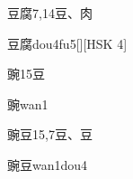 \begin{Entry}{豆腐}{7,14}{⾖、⾁}
  \begin{Phonetics}{豆腐}{dou4fu5}[][HSK 4]
  \end{Phonetics}
\end{Entry}

\begin{Entry}{豌}{15}{⾖}
  \begin{Phonetics}{豌}{wan1}
  \end{Phonetics}
\end{Entry}

\begin{Entry}{豌豆}{15,7}{⾖、⾖}
  \begin{Phonetics}{豌豆}{wan1dou4}
  \end{Phonetics}
\end{Entry}


